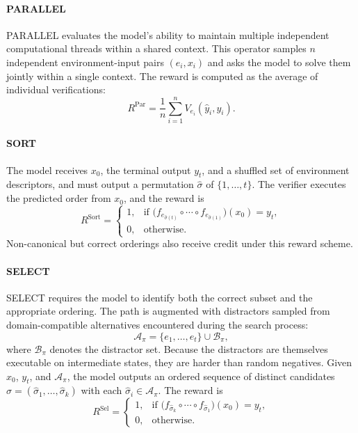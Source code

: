 \paragraph{PARALLEL}
PARALLEL evaluates the model's ability to maintain multiple independent computational threads within a shared context.
This operator samples $n$ independent environment-input pairs $(e_i,x_i)$ and asks the model to solve them jointly within a single context. The reward is computed as the average of individual verifications:
\begin{equation}
R^{\mathrm{Par}} = \frac{1}{n}\sum_{i=1}^{n}V_{e_i}(\hat y_i,y_i).
\label{eq:parallel_reward}
\end{equation}

\paragraph{SORT}
The model receives $x_0$, the terminal output $y_t$, and a shuffled set of environment descriptors, and must output a permutation $\hat{\sigma}$ of $\{1,\ldots,t\}$. The verifier executes the predicted order from $x_0$, and the reward is
\begin{equation}
R^{\mathrm{Sort}} = 
\begin{cases}
1, & \text{if } \bigl(f_{e_{\hat{\sigma}(t)}} \circ \cdots \circ f_{e_{\hat{\sigma}(1)}}\bigr)(x_0) = y_t, \\
0, & \text{otherwise.}
\end{cases}
\label{eq:sort_reward}
\end{equation}
Non-canonical but correct orderings also receive credit under this reward scheme.

\paragraph{SELECT}
SELECT requires the model to identify both the correct subset and the appropriate ordering. The path is augmented with distractors sampled from domain-compatible alternatives encountered during the search process:
\begin{equation}
\mathcal{A}_{\pi} = \{e_1,\ldots,e_t\} \cup \mathcal{B}_{\pi},
\label{eq:select_candidates}
\end{equation}
where $\mathcal{B}_{\pi}$ denotes the distractor set. Because the distractors are themselves executable on intermediate states, they are harder than random negatives. Given $x_0$, $y_t$, and $\mathcal{A}_{\pi}$, the model outputs an ordered sequence of distinct candidates $\hat{\sigma}=(\hat{\sigma}_1,\ldots,\hat{\sigma}_k)$ with each $\hat{\sigma}_i\in\mathcal{A}_{\pi}$. The reward is
\begin{equation}
R^{\mathrm{Sel}} = 
\begin{cases}
1, & \text{if } \bigl(f_{\hat{\sigma}_k} \circ \cdots \circ f_{\hat{\sigma}_1}\bigr)(x_0) = y_t, \\
0, & \text{otherwise.}
\end{cases}
\label{eq:select_reward}
\end{equation}